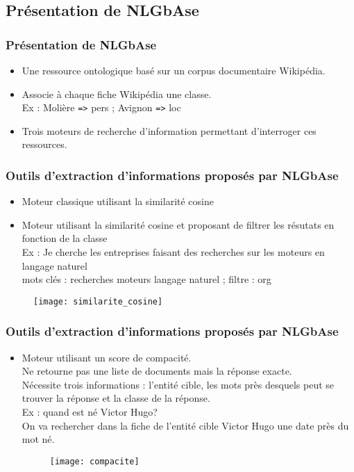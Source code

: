 \documentclass[xcolor=dvipsnames]{beamer}
\begin{document}
\subsection{Présentation de NLGbAse}
\frame
{
    \frametitle{Présentation de NLGbAse}
    \begin{itemize}
        \item Une ressource ontologique basé sur un corpus documentaire Wikipédia.
        \item Associe à chaque fiche Wikipédia une classe. \\
            Ex : Molière \texttt{=>} pers ; Avignon \texttt{=>} loc
        \item Trois moteurs de recherche d'information permettant d'interroger ces ressources.
    \end{itemize}
}
\frame
{
    \frametitle{Outils d'extraction d'informations proposés par NLGbAse}
    \begin{itemize}
        \item<1-> Moteur classique utilisant la similarité cosine
        \item<2-> Moteur utilisant la similarité cosine et proposant de filtrer les résutats en fonction de la classe \\
                Ex : Je cherche les entreprises faisant des recherches sur les moteurs en langage naturel \\
                mots clés : recherches moteurs langage naturel ; filtre : org
   \end{itemize}
    \begin{figure}
        \texttt{[image: similarite\_cosine]}
    \end{figure}

}
\frame
{
    \frametitle{Outils d'extraction d'informations proposés par NLGbAse}
    \begin{itemize}
        \item<1-> Moteur utilisant un score de compacité. \\
               Ne retourne pas une liste de documents mais la réponse exacte. \\
               Nécessite trois informations : l'entité cible, les mots près desquels peut se trouver la réponse et la classe de la réponse.\\
               Ex : quand est né Victor Hugo? \\
               On va rechercher dans la fiche de l'entité cible Victor Hugo une date près du mot \og{}né\fg{}.
    \begin{figure}
        \texttt{[image: compacite]}
     \end{figure}
   \end{itemize}
}
 
\end{document}
